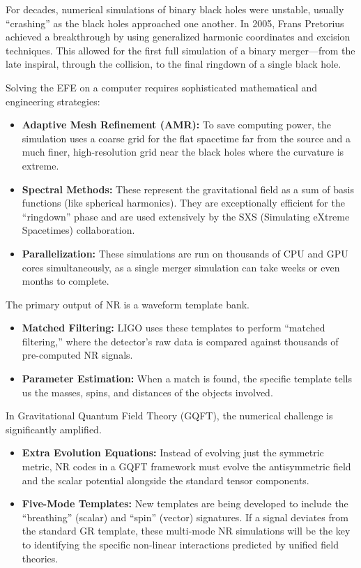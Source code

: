 For decades, numerical simulations of binary black holes were unstable, usually ``crashing'' as the black holes approached one another. In 2005, Frans Pretorius achieved a breakthrough by using generalized harmonic coordinates and excision techniques. This allowed for the first full simulation of a binary merger—from the late inspiral, through the collision, to the final ringdown of a single black hole.

Solving the EFE on a computer requires sophisticated mathematical and engineering strategies:
\begin{itemize}
  \item \textbf{Adaptive Mesh Refinement (AMR):} To save computing power, the simulation uses a coarse grid for the flat spacetime far from the source and a much finer, high-resolution grid near the black holes where the curvature is extreme.
  \item \textbf{Spectral Methods:} These represent the gravitational field as a sum of basis functions (like spherical harmonics). They are exceptionally efficient for the ``ringdown'' phase and are used extensively by the SXS (Simulating eXtreme Spacetimes) collaboration.
  \item \textbf{Parallelization:} These simulations are run on thousands of CPU and GPU cores simultaneously, as a single merger simulation can take weeks or even months to complete.
\end{itemize}

The primary output of NR is a waveform template bank.
\begin{itemize}
  \item \textbf{Matched Filtering:} LIGO uses these templates to perform ``matched filtering,'' where the detector's raw data is compared against thousands of pre-computed NR signals.
  \item \textbf{Parameter Estimation:} When a match is found, the specific template tells us the masses, spins, and distances of the objects involved.
\end{itemize}

In Gravitational Quantum Field Theory (GQFT), the numerical challenge is significantly amplified.
\begin{itemize}
  \item \textbf{Extra Evolution Equations:} Instead of evolving just the symmetric metric, NR codes in a GQFT framework must evolve the antisymmetric field and the scalar potential alongside the standard tensor components.
  \item \textbf{Five-Mode Templates:} New templates are being developed to include the ``breathing'' (scalar) and ``spin'' (vector) signatures. If a signal deviates from the standard GR template, these multi-mode NR simulations will be the key to identifying the specific non-linear interactions predicted by unified field theories.
\end{itemize}
